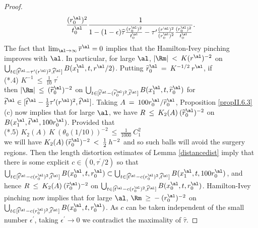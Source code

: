 \begin{proof}
\begin{equation}
\frac{(r_0^\al)^2}{t_0^\al}
\frac{1}{1 - (1-\epsilon) \widehat{\tau} \frac{(r_0^\al)^2}{t_0^\al}
- \tau^\prime \frac{(r^\al)^2}{(r_0^\al)^2} \frac{(r_0^\al)^2}{t_0^\al}
}.
\end{equation}
The fact that $\lim_{\al \rightarrow \infty} \overline{r}^\al = 0$
implies that the Hamilton-Ivey pinching improves with $\al$. In
particular, for large $\al$, $|\Rm| \: < \: K (r^\al)^{-2}$ on
$\bigcup_{t \in [\widehat{t}^\al - \tau^\prime (r^\al)^2,
\widehat{t}^\al]} B(x_1^\al, t, r^\al/2)$. Putting
$\widetilde{r}_0^\al \: = \: K^{-1/2} \: r^\al$,  if \\
(*.4) $K^{-1} \: \le \: \frac{1}{10} \: \tau^\prime$ \\
then $|\Rm| \: \le \: (\widetilde{r}_0^\al)^{-2}$ on
$\bigcup_{t \in [\widetilde{t}^\al - (\widetilde{r}_0^\al)^2,
\widetilde{t}^\al]} B(x_1^\al, t, \widetilde{r}_0^\al)$ for
$\widetilde{t}^\al \in [\widehat{t}^\al - \frac12 \tau^\prime (r^\al)^2,
\widehat{t}^\al]$.
Taking $A \: = \: 100 r_0^\al/\widetilde{r}_0^\al$, Proposition
\ref{propII.6.3}(c)
now implies that
for large $\al$, we have
$R \: \le \: K_2(A) \: (\widetilde{r}^\al_0)^{-2}$ on
$B(x_1^\al, \widetilde{t}^\al, 100 r_0^\al)$.
Provided that \\
(*.5) $K_2(A) \: K
\: (\theta_0(1/10))^{-2} \: \le \: \frac{1}{1000} \: C_1^{2}$ \\
we will have $K_2(A) \: (\widetilde{r}^\al_0)^{-2} \: < \: \frac12 \: h^{-2}$
and so such balls will avoid the surgery regions.
Then the length distortion estimates
of Lemma \ref{distancedist} imply that there is some explicit
$c \in (0, \tau^\prime/2)$ so that
$\bigcup_{t \in [\widehat{t}^\al - c (r_0^\al)^2, \widehat{t}^\al]}
B(x_0^\al, t, r_0^\al) \subset
\bigcup_{t \in [\widehat{t}^\al - c (r_0^\al)^2, \widehat{t}^\al]}
B(x_1^\al, t, 100 r_0^\al)$,
and hence
$R \: \le \: K_2(A) \: (\widetilde{r}_0^\al)^{-2}$ on
$\bigcup_{t \in [\widehat{t}^\al - c (r_0^\al)^2, \widehat{t}^\al]}
B(x_0^\al, t, r_0^\al)$.
Hamilton-Ivey pinching now
implies that for large $\al$,
$\Rm \: \ge \: - \: (r_0^\al)^{-2}$ on
$\bigcup_{t \in [\widehat{t}^\al - c (r_0^\al)^2, \widehat{t}^\al]}
B(x_0^\al, t, r_0^\al)$.
As $c$ can be taken independent
of the small number $\epsilon^\prime$, taking $\epsilon^\prime \rightarrow 0$
we contradict the maximality of
$\widehat{\tau}$.
\end{proof}

